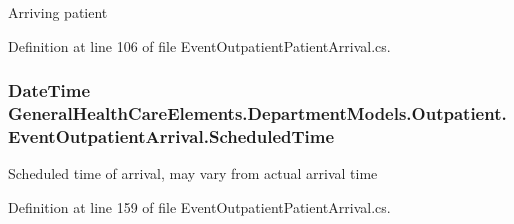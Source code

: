 Arriving patient 



Definition at line 106 of file Event\+Outpatient\+Patient\+Arrival.\+cs.

\subsubsection[{\texorpdfstring{Scheduled\+Time}{ScheduledTime}}]{\setlength{\rightskip}{0pt plus 5cm}Date\+Time General\+Health\+Care\+Elements.\+Department\+Models.\+Outpatient.\+Event\+Outpatient\+Arrival.\+Scheduled\+Time\hspace{0.3cm}{\ttfamily [get]}}\hypertarget{class_general_health_care_elements_1_1_department_models_1_1_outpatient_1_1_event_outpatient_arrival_ac7e8efc7a0a4e0f4580484f8594b4f39}{}\label{class_general_health_care_elements_1_1_department_models_1_1_outpatient_1_1_event_outpatient_arrival_ac7e8efc7a0a4e0f4580484f8594b4f39}


Scheduled time of arrival, may vary from actual arrival time 



Definition at line 159 of file Event\+Outpatient\+Patient\+Arrival.\+cs.

